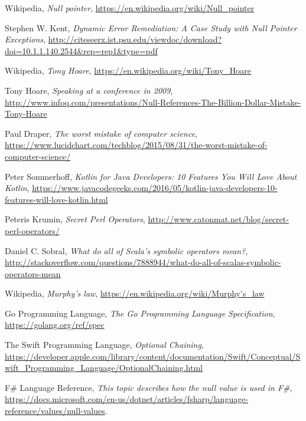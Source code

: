 \documentclass[11pt, a4paper]{report}
\begin{document}
\listoffigures

\begin{thebibliography}{100}
	
    Wikipedia,
    \emph{Null pointer},
    \url{https://en.wikipedia.org/wiki/Null_pointer}

    Stephen W. Kent,
    \textit{Dynamic Error Remediation: A Case Study with Null Pointer Exceptions},
    \url{http://citeseerx.ist.psu.edu/viewdoc/download?doi=10.1.1.140.2544&rep=rep1&type=pdf}

    Wikipedia,
    \textit{Tony Hoare},
    \url{https://en.wikipedia.org/wiki/Tony_Hoare}
    
    Tony Hoare,
    \textit{Speaking at a conference in 2009},
    \url{http://www.infoq.com/presentations/Null-References-The-Billion-Dollar-Mistake-Tony-Hoare}

    Paul Draper,
    \textit{The worst mistake of computer science},
    \url{https://www.lucidchart.com/techblog/2015/08/31/the-worst-mistake-of-computer-science/}

 	Peter Sommerhoff,
 	\textit{Kotlin for Java Developers: 10 Features You Will Love About Kotlin},
 	\url{https://www.javacodegeeks.com/2016/05/kotlin-java-developers-10-features-will-love-kotlin.html}

    Peteris Krumin,
    \textit{Secret Perl Operators},
    \url{http://www.catonmat.net/blog/secret-perl-operators/}

    Daniel C. Sobral,
    \textit{What do all of Scala's symbolic operators mean?},
    \url{http://stackoverflow.com/questions/7888944/what-do-all-of-scalas-symbolic-operators-mean}
    
    Wikipedia,
    \textit{Murphy's law},
    \url{https://en.wikipedia.org/wiki/Murphy's_law}

    Go Programming Language,
    \textit{The Go Programming Language Specification},
    \url{https://golang.org/ref/spec}

    The Swift Programming Language,
    \textit{Optional Chaining},
    \url{https://developer.apple.com/library/content/documentation/Swift/Conceptual/Swift_Programming_Language/OptionalChaining.html}
    
    F\# Language Reference,
    \textit{This topic describes how the null value is used in F\#},
    \url{https://docs.microsoft.com/en-us/dotnet/articles/fsharp/language-reference/values/null-values}.


\end{thebibliography}
\end{document}
